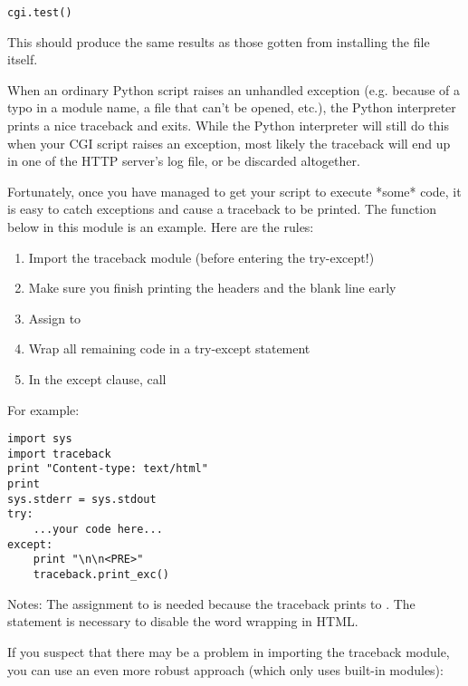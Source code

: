 \bcode\begin{verbatim}
cgi.test()
\end{verbatim}\ecode
%
This should produce the same results as those gotten from installing
the  file itself.

When an ordinary Python script raises an unhandled exception
(e.g. because of a typo in a module name, a file that can't be opened,
etc.), the Python interpreter prints a nice traceback and exits.
While the Python interpreter will still do this when your CGI script
raises an exception, most likely the traceback will end up in one of
the HTTP server's log file, or be discarded altogether.

Fortunately, once you have managed to get your script to execute
*some* code, it is easy to catch exceptions and cause a traceback to
be printed.  The  function below in this module is an example.
Here are the rules:

\begin{enumerate}
	\item Import the traceback module (before entering the
	   try-except!)
	
	\item Make sure you finish printing the headers and the blank
	   line early
	
	\item Assign  to 
	
	\item Wrap all remaining code in a try-except statement
	
	\item In the except clause, call 
\end{enumerate}

For example:

\bcode\begin{verbatim}
import sys
import traceback
print "Content-type: text/html"
print
sys.stderr = sys.stdout
try:
    ...your code here...
except:
    print "\n\n<PRE>"
    traceback.print_exc()
\end{verbatim}\ecode
%
Notes: The assignment to  is needed because the traceback
prints to .  The  statement is necessary to
disable the word wrapping in HTML.

If you suspect that there may be a problem in importing the traceback
module, you can use an even more robust approach (which only uses
built-in modules):

